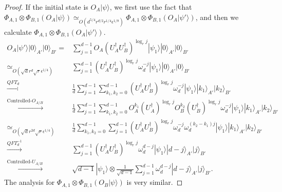 \documentclass[11pt,letterpaper]{article}
\newcommand{\ket}[1]{|#1\rangle}
\newcommand{\x}{\otimes}
\newcommand{\ct}{^{\dagger}}
\newcommand{\1}{\mathbb{1}}
\newcommand{\ep}{\epsilon}
\newcommand{\sd}{\sqrt{d}}
\newcommand{\sr}{\sqrt{r}}
\newcommand{\appd}[1]{\simeq_{#1}}
\theoremstyle{definition}
\begin{document}
\begin{proof}
If the initial state is $O_A\ket{\psi}$, we first use the fact that 
$ \Phi_{A,1} \x \Phi_{B,1} (O_A\ket{\psi}) \appd{O(d^{5/4} r^{d/2} r^{1/4} \ep^{1/8})}  \Phi_{A,1} \x \Phi_{B,1} (O_A\ket{\psi'})$, 
and then we calculate $\Phi_{A,1} \x \Phi_{B,1} (O_A\ket{\psi'})$.
\begin{align}
	O_A \ket{\psi'} \ket{0}_{A'}\ket{0}_{B'} =&  
		\sum_{j=1}^{d-1} O_A(U_A\ct U_B\ct)^{\log_r j}\ket{\psi_1}\ket{0}_{A'}\ket{0}_{B'}\\
		\appd{O(\sd r^d \sr \ep^{1/4})}&\sum_{j=1}^{d-1}(U_A\ct U_B\ct)^{\log_r j} \omega_d^{-j} \ket{\psi_1} \ket{0}_{A'}\ket{0}_{B'}\\
		\xrightarrow[]{QFT_d} &\frac{1}{d}\sum_{j=1}^{d-1} \sum_{k_1,k_2 = 0}^{d-1}(U_A\ct U_B\ct)^{\log_r j} \omega_d^{-j} 
		\ket{\psi_1}\ket{k_1}_{A'}\ket{k_2}_{B'}\\
		\xrightarrow[]{\text{Controlled-}O_{A/B}}&\frac{1}{d}\sum_{j=1}^{d-1}\sum_{k_1,k_2 = 0}^{d-1} 
		 O_A^{k_1}(U_A\ct)^{\log_r j} O_B^{k_2}(U_B\ct)^{\log_r j} \omega_d^{-j} \ket{\psi_1} \ket{k_1}_{A'}\ket{k_2}_{B'}\\
		\appd{O(\sd r^{2d}  \sr \ep^{1/4})}& \frac{1}{d}\sum_{k_1,k_2 = 0}^{d-1} \sum_{j=1}^{d-1} (U_A\ct U_B\ct)^{\log_r j}
		\omega_d^{-j}\omega_d^{(k_2-k_1)j}\ket{\psi_1}
		 \ket{k_1}_{A'}\ket{k_2}_{B'}\\
		\xrightarrow[]{QFT_d^{-1}}& \sum_{j=1}^{d-1}  (U_A\ct U_B\ct)^{\log_r j}  
		\omega_d^{d-j}\ket{\psi_1} \ket{d-j}_{A'}\ket{j}_{B'}\\
		\xrightarrow[]{\text{Controlled-}U_{A/B}}&   \sqrt{d-1} \ket{\psi_1} \x  
		\frac{1}{\sqrt{d-1}}\sum_{j=1}^{d-1} \omega_d^{d-j}\ket{d-j}_{A'}\ket{j}_{B'}.
\end{align}
The analysis for $\Phi_{A,1} \x\Phi_{B,1} (O_B \ket{\psi})$ is very similar.


\end{proof}
\end{document}
